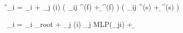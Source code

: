 \H_i = \X_i +
               \sum\limits_{j \in {}(i)}
                    \sigma \left( \z_{ij} \W^{(f)} + \b^{(f)} \right)
                    \odot
                    \g \left( \z_{ij} \W^{(s)} + \b^{(s)} \right)

\Z_i = \X_{i} \W_{\textrm{root}} +
\sum\limits_{j \in {}(i)} \X_{j} \textrm{MLP}(\E_{ji}) + \b
